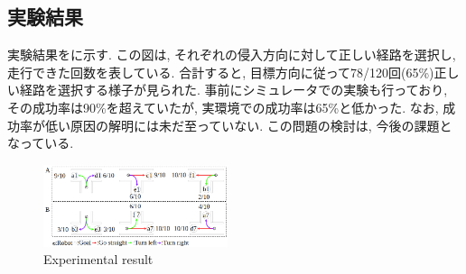 \documentclass[10pt]{jarticle}
\begin{document}
    \subsection{実験結果}   
    実験結果をに示す. この図は, それぞれの侵入方向に対して正しい経路を選択し, 走行できた回数を表している. 合計すると, 目標方向に従って78/120回(65\%)正しい経路を選択する様子が見られた. 事前にシミュレータでの実験も行っており, その成功率は90\%を超えていたが, 実環境での成功率は65\%と低かった. なお, 成功率が低い原因の解明には未だ至っていない. この問題の検討は, 今後の課題となっている.
    \begin{center}
        \begin{figure}[h]
            \centering
            \includegraphics[width=0.48\textwidth]{./fig/real_result.png}
            \caption{Experimental result}
            \label{fig:result1}
        \end{figure}
    \end{center}
    

    \vspace{-1.0cm}

    
    
\end{document}
